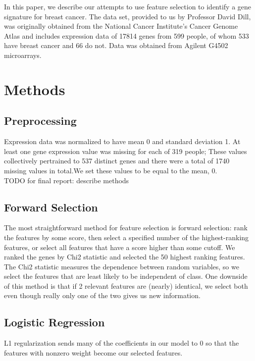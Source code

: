 \documentclass[11pt]{article}
\begin{document}
In this paper, we describe our attempts to use feature selection to identify a gene signature for breast cancer. The data set, provided to us by Professor David Dill, was originally obtained from the National Cancer Institute's Cancer Genome Atlas and includes expression data of 17814 genes from 599 people, of whom 533 have breast cancer and 66 do not. Data was obtained from Agilent G4502 microarrays. 

\section{Methods}
\setcounter{subsection}{-1} %
\subsection{Preprocessing} 
Expression data was normalized to have mean 0 and standard deviation 1. At least one gene expression value was missing for each of 319 people; These values collectively pertrained to 537 distinct genes and there were a total of 1740 missing values in total.We set these values to be equal to the mean, 0. \\

TODO for final report: describe methods
\subsection{Forward Selection}
The most straightforward method for feature selection is forward selection: rank the features by some score, then select a specified number of the highest-ranking features, or select all features that have a score higher than some cutoff. We ranked the genes by Chi2 statistic and selected the 50 highest ranking features. The Chi2 statistic measures the dependence between random variables, so we select the features that are least likely to be independent of class. One downside of this method is that if 2 relevant features are (nearly) identical, we select both even though really only one of the two gives us new information.

\subsection{Logistic Regression}
L1 regularization sends many of the coefficients in our model to 0 so that the features with nonzero weight become our selected features.
\end{document}
